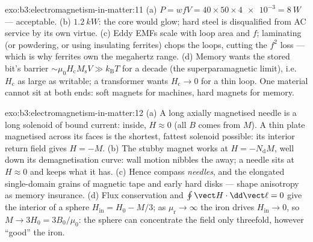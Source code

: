 \begin{solution}{exo:b3:electromagnetism-in-matter:11}
(a) $P = wfV = 40\times50\times\num{4e-3} = \qty{8}{W}$ ---
acceptable. (b) $\qty{1.2}{kW}$: the core would glow; hard steel
is disqualified from AC service by its own virtue. (c) Eddy EMFs
scale with loop area and $f$; laminating (or powdering, or using
insulating ferrites) chops the loops, cutting the $f^2$ loss ---
which is why ferrites own the megahertz range. (d) Memory wants
the stored bit's barrier $\sim\mu_0H_{\text{c}}M_{\text{s}}V \gg
k_{\text{B}}T$ for a decade (the superparamagnetic limit), i.e.\
$H_{\text{c}}$ as large as writable; a transformer wants
$H_{\text{c}} \to 0$ for a thin loop. One material cannot sit at
both ends: soft magnets for machines, hard magnets for memory.
\end{solution}

\begin{solution}{exo:b3:electromagnetism-in-matter:12}
(a) A long axially magnetised needle is a long solenoid of bound
current: inside, $H \approx 0$ (all $B$ comes from $M$). A thin
plate magnetised across its faces is the shortest, fattest
solenoid possible: its interior return field gives $H = -M$. (b)
The stubby magnet works at $H = -N_{\text{d}}M$, well down its
demagnetisation curve: wall motion nibbles the  away; a
needle sits at $H \approx 0$ and keeps what it has. (c) Hence
compass \emph{needles}, and the elongated single-domain grains of
magnetic tape and early hard disks --- shape anisotropy as memory
insurance. (d) Flux conservation and $\oint\vect H\cdot
\dd\vect\ell = 0$ give the interior of a sphere $H_{\text{in}} =
H_0 - M/3$; as $\mu_{\text{r}}\to\infty$ the iron drives
$H_{\text{in}}\to0$, so $M \to 3H_0 = 3B_0/\mu_0$: the sphere can
concentrate the field only threefold, however ``good'' the iron.
\end{solution}

